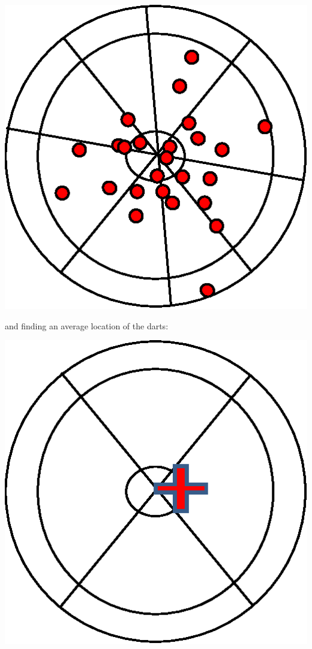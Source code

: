 \documentclass[twoside,11pt,ShortChapTitles]{BYUTextbook}
\begin{document}
\begin{center}
\includegraphics[scale=0.5]{Lab2_figs/bullseye_many.eps}
\end{center}

and finding an average location of the darts:

\begin{center}
\includegraphics[scale=0.5]{Lab2_figs/bullseye_avg.eps}
\end{center}
\end{document}
